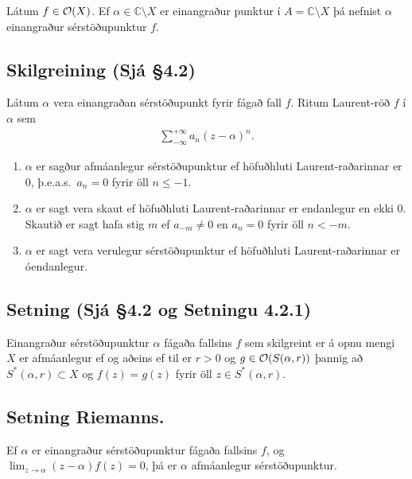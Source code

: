 \documentclass[a4paper,10pt,icelandic]{sphinxmanual}
\begin{document}
Látum \(f\in{\cal O}(X)\). Ef \(\alpha\in\mathbb{C}\setminus X\) er einangraður punktur í \(A=\mathbb{C}\setminus X\) þá nefnist \(\alpha\) einangraður sérstöðupunktur \(f\).


\subsection{Skilgreining (Sjá \S{}4.2)}
\label{\detokenize{Kafli04:id2}}
Látum \(\alpha\) vera einangraðan sérstöðupunkt fyrir fágað fall \(f\). Ritum Laurent-röð \(f\) í \(\alpha\) sem
\begin{equation*}
\begin{split}\sum_{-\infty}^{+\infty}a_n(z-\alpha)^ n.\end{split}
\end{equation*}\begin{enumerate}
%
\item {} 
\(\alpha\) er sagður afmáanlegur sérstöðupunktur ef höfuðhluti Laurent-raðarinnar er \(0\), þ.e.a.s. \(a_n=0\) fyrir öll \(n\leq -1\).

\item {} 
\(\alpha\) er sagt vera skaut ef höfuðhluti Laurent-raðarinnar er endanlegur en ekki 0. Skautið er sagt hafa stig \(m\) ef \(a_{-m}\neq 0\) en \(a_n=0\) fyrir öll \(n<-m\).

\item {} 
\(\alpha\) er sagt vera verulegur sérstöðupunktur ef höfuðhluti Laurent-raðarinnar er óendanlegur.

\end{enumerate}


\subsection{Setning (Sjá \S{}4.2 og Setningu 4.2.1)}
\label{\detokenize{Kafli04:setning-sja-4-2-og-setningu-4-2-1}}
Einangraður sérstöðupunktur \({\alpha}\) fágaða fallsins \(f\) sem skilgreint er á opnu mengi \(X\) er afmáanlegur ef og aðeins ef til er \(r>0\) og \(g\in {\cal O}(S({\alpha},r))\) þannig að \(S^*({\alpha},r)\subset X\) og \(f(z)=g(z)\) fyrir öll \(z\in S^*({\alpha},r)\).


\subsection{Setning Riemanns.}
\label{\detokenize{Kafli04:setning-riemanns}}
Ef \(\alpha\) er einangraður sérstöðupunktur
fágaða fallsins \(f\), og
\(\lim_{z\to \alpha}(z-\alpha)f(z)= 0\), þá er \(\alpha\)
afmáanlegur sérstöðupunktur.
\end{document}
